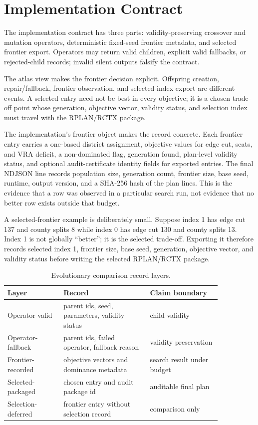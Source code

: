\section{Implementation Contract}

The implementation contract has three parts: validity-preserving crossover and
mutation operators, deterministic fixed-seed frontier metadata, and selected
frontier export. Operators may return valid children, explicit valid fallbacks,
or rejected-child records; invalid silent outputs falsify the contract.

The atlas view makes the frontier decision explicit. Offspring creation,
repair/fallback, frontier observation, and selected-index export are different
events. A selected entry need not be best in every objective; it is a chosen
trade-off point whose generation, objective vector, validity status, and
selection index must travel with the RPLAN/RCTX package.

The implementation's frontier object makes the record concrete. Each frontier
entry carries a one-based district assignment, objective values for edge cut,
seats, and VRA deficit, a non-dominated flag, generation found, plan-level
validity status, and optional audit-certificate identity fields for exported
entries. The final NDJSON line records population size, generation count,
frontier size, base seed, runtime, output version, and a SHA-256 hash of the
plan lines. This is the evidence that a row was observed in a particular search
run, not evidence that no better row exists outside that budget.

A selected-frontier example is deliberately small. Suppose index 1 has edge cut
137 and county splits 8 while index 0 has edge cut 130 and county splits 13.
Index 1 is not globally ``better''; it is the selected trade-off. Exporting it
therefore records selected index 1, frontier size, base seed, generation,
objective vector, and validity status before writing the selected RPLAN/RCTX
package.

\begin{table}[htbp]
\centering
\small
\begin{tabular}{p{0.22\linewidth}p{0.34\linewidth}p{0.29\linewidth}}
\toprule
Layer & Record & Claim boundary \\
\midrule
Operator-valid & parent ids, seed, parameters, validity status & child validity \\
Operator-fallback & parent ids, failed operator, fallback reason & validity preservation \\
Frontier-recorded & objective vectors and dominance metadata & search result under budget \\
Selected-packaged & chosen entry and audit package id & auditable final plan \\
Selection-deferred & frontier entry without selection record & comparison only \\
\bottomrule
\end{tabular}
\caption{Evolutionary comparison record layers.}
\end{table}

